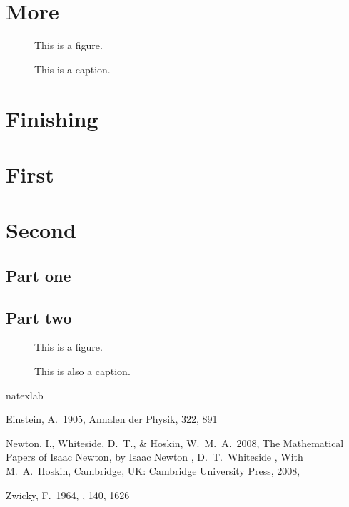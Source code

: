 \documentclass{utthesis}
\begin{document}
\chapter{More}
\lipsum[3]
\begin{figure}
This is a figure.
\caption[This]{This is a caption.}
\end{figure}

\chapter{Finishing}
\lipsum[3]

\begin{appendix}

\chapter{First}
\lipsum[3]

\chapter{Second}
\section{Part one}
\lipsum[3]
\section{Part two}
\begin{figure}
This is a figure.
\caption[That]{This is also a caption.}
\end{figure}

\end{appendix}

\backmatter

\printindex

\cleardoublepage
{}


\begin{thebibliography}{}
\expandafter\ifx\csname natexlab\endcsname\relax\def\natexlab#1{#1}\fi

 Einstein, A.\ 1905, Annalen der Physik, 322, 891 

 Newton, I., Whiteside, D.~T., \& Hoskin, W.~M.~A.\ 2008, The Mathematical Papers of Isaac Newton, by Isaac Newton , D.~T.~Whiteside , With M.~A.~Hoskin, Cambridge, UK: Cambridge University Press, 2008,  

 Zwicky, F.\ 1964, \apj, 140, 1626 
\end{thebibliography}
\end{document}
